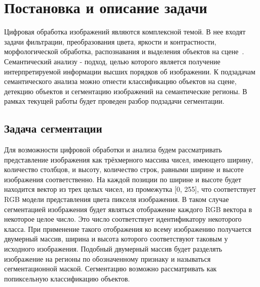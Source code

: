 
\section{Постановка и описание задачи}

Цифровая обработка изображений являются комплексной темой.
В нее входят задачи фильтрации, преобразования цвета, яркости и контрастности,
морфологической обработка, распознавания и выделения объектов на сцене~\autocite{gonzalez2008digital}.
Семантический анализу - подход, целью которого является получение интерпретируемой информации высших порядков об изображении.
К подзадачам семантического анализа можно отнести классификацию объектов на сцене, детекцию объектов и сегментацию изображений на семантические регионы.
В рамках текущей работы будет проведен разбор подзадачи сегментации.

\subsection{Задача сегментации}

Для возможности цифровой обработки и анализа будем рассматривать представление изображения как трёхмерного массива чисел,
имеющего ширину, количество столбцов, и высоту, количество строк, равными ширине и высоте изображения соответственно.
На каждой позиции по ширине и высоте будет находится вектор из трех целых чисел, из промежутка [0, 255], что
соответствует RGB модели представления цвета пикселя изображения.
В таком случае сегментацией изображения будет являться отображение каждого RGB вектора в некоторое целое число.
Это число соответствует идентификатору некоторого класса.
При применение такого отображения ко всему изображению получается двумерный массив, ширина и высота которого
соответствуют таковым у исходного изображения.
Подобный двумерный массив будет разделять изображение на регионы по обозначенному признаку и называться сегментационной маской.
Сегментацию возможно рассматривать как попиксельную классификацию объектов.

